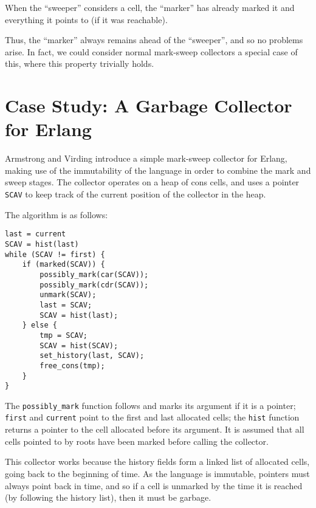\begin{definition}
  When the ``sweeper'' considers a cell, the ``marker'' has already
  marked it and everything it points to (if it was reachable).
\end{definition}

Thus, the ``marker'' always remains ahead of the ``sweeper'', and so
no problems arise. In fact, we could consider normal \gls{mark-sweep}
\glspl{collector} a special case of this, where this property
trivially holds.

\section{Case Study: A Garbage Collector for Erlang}

Armstrong and Virding\cite{Armstrong95} introduce a simple
\gls{mark-sweep} \gls{collector} for Erlang, making use of the
immutability of the language in order to combine the mark and sweep
stages. The \gls{collector} operates on a \gls{heap} of cons cells,
and uses a \gls{pointer} \texttt{SCAV} to keep track of the current
position of the \gls{collector} in the heap.

The algorithm is as follows:

\begin{lstlisting}
last = current
SCAV = hist(last)
while (SCAV != first) {
    if (marked(SCAV)) {
        possibly_mark(car(SCAV));
        possibly_mark(cdr(SCAV));
        unmark(SCAV);
        last = SCAV;
        SCAV = hist(last);
    } else {
        tmp = SCAV;
        SCAV = hist(SCAV);
        set_history(last, SCAV);
        free_cons(tmp);
    }
}
\end{lstlisting}

The \texttt{possibly\_mark} function follows and marks its argument if
it is a pointer; \texttt{first} and \texttt{current} point to the
first and last allocated \glspl{cell}; the \texttt{hist} function
returns a \gls{pointer} to the \gls{cell} allocated before its
argument. It is assumed that all cells pointed to by roots have been
marked before calling the collector.

This \gls{collector} works because the history fields form a linked
list of allocated \glspl{cell}, going back to the beginning of
time. As the language is immutable, \glspl{pointer} must always point
back in time, and so if a \gls{cell} is unmarked by the time it is
reached (by following the history list), then it must be
\gls{garbage}.

